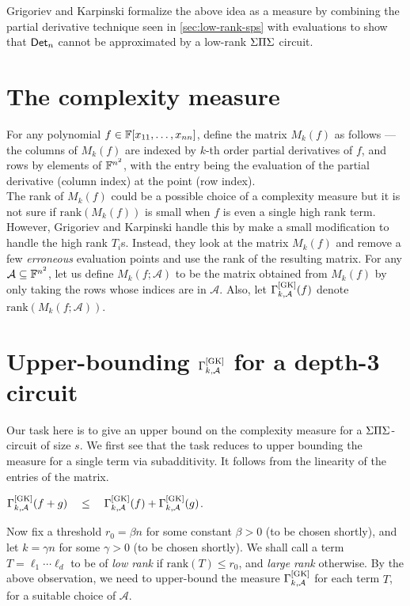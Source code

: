 Grigoriev and Karpinski \cite{grigoriev98} formalize the above idea as a measure by combining the partial derivative technique seen in \autoref{sec:low-rank-sps} with evaluations to show that $\mathsf{Det}_n$ cannot be approximated by a low-rank $\Sigma\Pi\Sigma$ circuit.

\section{The complexity measure}

For any polynomial $f \in \mathbb{F}[x_{11},\dots, x_{nn}]$, define the matrix $M_k(f)$ as follows --- the columns of $M_k(f)$ are indexed by $k$-th order partial derivatives of $f$, and rows by elements of $\mathbb{F}^{n^2}$, with the entry being the evaluation of the partial derivative (column
index) at the point (row index).\\

The rank of $M_k(f)$ could be a possible choice of a complexity measure but it is not sure if $\mathrm{rank}(M_k(f))$ is small when $f$ is even a single high rank term. However,  Grigoriev and Karpinski handle this by make a small modification to handle the high rank $T_i$s. Instead, they look at the matrix $M_k(f)$ and remove a few \emph{erroneous} evaluation points and use the rank of the resulting matrix. For any $\mathcal{A}\subseteq \mathbb{F}^{n^2}$, let us define $M_k(f;\mathcal{A})$ to be the matrix obtained from $M_k(f)$ by only taking the rows whose indices are in $\mathcal{A}$. Also, let $\Gamma^{\mathrm{[GK]}}_{k,\mathcal{A}}(f)$ denote $\mathrm{rank}(M_k(f;\mathcal{A}))$.



\section{Upper-bounding $\Gamma^{\mathrm{[GK]}}_{k,\mathcal{A}}$ for a depth-3 circuit}\label{sec:gk-upper-bound}

Our task here is to give an upper bound on the complexity measure for a $\Sigma\Pi\Sigma$-circuit of size $s$. We first see that the task reduces to upper bounding the measure for a single term via subadditivity. It follows from the linearity of the entries of the matrix.

\begin{observation}\label{obs:GK-subadditivity}
  $\Gamma^{\mathrm{[GK]}}_{k,\mathcal{A}}(f + g) \quad\leq\quad \Gamma^{\mathrm{[GK]}}_{k,\mathcal{A}}(f) + \Gamma^{\mathrm{[GK]}}_{k,\mathcal{A}}(g)$.
\end{observation}

Now fix a threshold $r_0 = \beta n$ for some constant $\beta > 0$ (to be chosen shortly), and let $k = \gamma n$ for some $\gamma>0$ (to be chosen shortly). We shall call a term $T = \ell_1\cdots \ell_d$ to be of \emph{low rank} if $\mathrm{rank}(T) \leq r_0$, and \emph{large rank} otherwise. By the above observation, we need to upper-bound the measure $\Gamma^{\mathrm{[GK]}}_{k,\mathcal{A}}$ for each term $T$, for a
suitable choice of $\mathcal{A}$.\\

